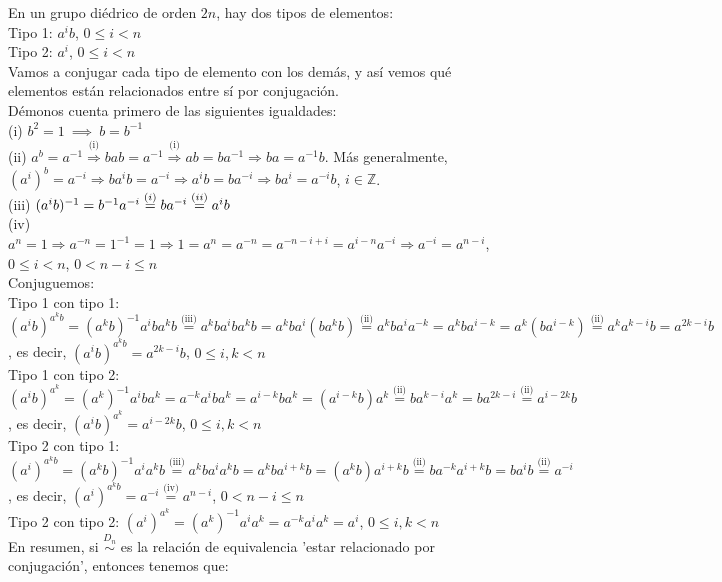 \documentclass{article}
\begin{document}
En un grupo diédrico de orden $2n$, hay dos tipos de elementos:\\
Tipo 1: $a^ib$, $0 \leqslant i < n$\\
Tipo 2: $a^i$, $0 \leqslant i < n$\\
Vamos a conjugar cada tipo de elemento con los demás, y así vemos qué elementos están relacionados entre sí por conjugación.\\
Démonos cuenta primero de las siguientes igualdades:\\
(i) $b^2 = 1 \ \implies \ b = b^{-1}$\\
(ii) $a^b = a^{-1} \overset{\text{(i)}}{\Longrightarrow} bab = a^{-1} \overset{\text{(i)}}{\Longrightarrow} ab = ba^{-1} \Longrightarrow ba = a^{-1}b$. Más generalmente, $(a^i)^b = a^{-i} \Longrightarrow ba^ib = a^{-i} \Longrightarrow a^ib = ba^{-i} \Longrightarrow ba^i = a^{-i}b$, $i \in \mathbb{Z}$.\\
(iii) $(a^ib)^{-1} = b^{-1}a^{-i} \overset{\text(i)}{=} ba^{-i} \overset{\text(ii)}{=} a^ib$\\
(iv) $a^n = 1 \Longrightarrow a^{-n} = 1^{-1} = 1 \Longrightarrow 1 = a^n = a^{-n} = a^{-n - i + i} = a^{i - n}a^{-i} \Longrightarrow a^{-i} = a^{n - i}$, $0 \leqslant i < n $, $0 < n - i \leqslant n$\\
Conjuguemos:\\
Tipo 1 con tipo 1: $(a^ib)^{a^kb} = (a^kb)^{-1}a^iba^kb \overset{\text{(iii)}}{=} a^kba^iba^kb = a^kba^i(ba^kb) \overset{\text{(ii)}}{=} a^kba^ia^{-k} = a^kba^{i - k} = a^k(ba^{i - k}) \overset{\text{(ii)}}{=} a^ka^{k - i}b = a^{2k - i}b$, es decir, $(a^ib)^{a^kb} = a^{2k - i}b$, $0 \leqslant i, k < n$\\
Tipo 1 con tipo 2: $(a^ib)^{a^k} = (a^k)^{-1}a^iba^k = a^{-k}a^iba^k = a^{i - k}ba^k = (a^{i - k}b)a^k \overset{\text{(ii)}}{=} ba^{k - i}a^k = ba^{2k - i} \overset{\text{(ii)}}{=} a^{i - 2k}b$, es decir, $(a^ib)^{a^k} = a^{i - 2k}b$, $0 \leqslant i, k < n$\\
Tipo 2 con tipo 1: $(a^i)^{a^kb} = (a^kb)^{-1}a^ia^kb \overset{\text{(iii)}}{=} a^kba^ia^kb = a^kba^{i + k}b =  (a^kb)a^{i + k}b \overset{\text{(ii)}}{=} ba^{-k}a^{i + k}b = ba^ib \overset{\text{(ii)}}{=} a^{-i}$, es decir, $(a^i)^{a^kb} = a^{-i} \overset{\text{(iv)}}{=} a^{n - i}$, $0 < n - i \leqslant n$\\
Tipo 2 con tipo 2: $(a^i)^{a^k} = (a^k)^{-1}a^ia^k = a^{-k}a^ia^k = a^i$, $0 \leqslant i, k < n$\\
En resumen, si $\overset{D_n}{\sim }$ es la relación de equivalencia 'estar relacionado por conjugación', entonces tenemos que:\\
\end{document}
